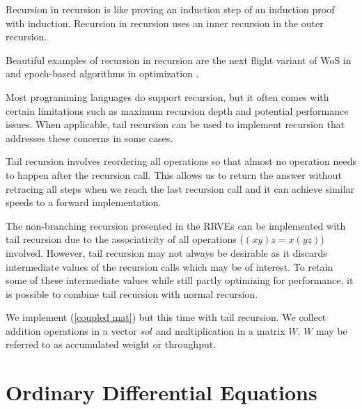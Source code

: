 \documentclass[a4paper,12pt]{article}
\begin{document}
\begin{technique}\label{tech:recu in recu}
    Recursion in recursion is like proving an induction
    step of an induction proof with induction. Recursion in recursion
    uses an inner recursion in the outer recursion.
\end{technique}

\begin{related}
    Beautiful examples of recursion in recursion are
    the next flight variant of WoS in
    \cite{sawhney_grid-free_2022} and epoch-based algorithms in optimization
    \cite{gupta_convergence_2021}.
\end{related}

Most programming languages do support recursion, but it often comes with certain
limitations such as maximum recursion depth and potential performance issues.
When applicable, tail recursion can be used to
implement recursion that addresses these concerns in some cases.

\begin{technique}
    Tail recursion involves reordering all operations
    so that almost no operation needs to happen after
    the recursion call. This allows us to return the
    answer without retracing all steps when we reach
    the last recursion call and it can achieve similar
    speeds to a forward implementation.
\end{technique}

The non-branching recursion presented in the RRVEs
can be implemented with tail recursion due to the associativity of
all operations ($(xy)z = x(yz)$) involved. However, tail recursion
may not always be desirable as it discards intermediate values of
the recursion calls which may be of interest. To retain some of these intermediate
values while still partly optimizing for performance, it is possible
to combine tail recursion with normal recursion.

\begin{pythonn}
    We implement (\ref{coupled mat}) but this time with tail recursion.
    We collect addition operations in a vector $sol$ and multiplication
    in a matrix $W$. $W$ may be referred to as accumulated weight or throughput.
    \vspace{0.3cm}
\end{pythonn}

\section{Ordinary Differential Equations}
\end{document}
